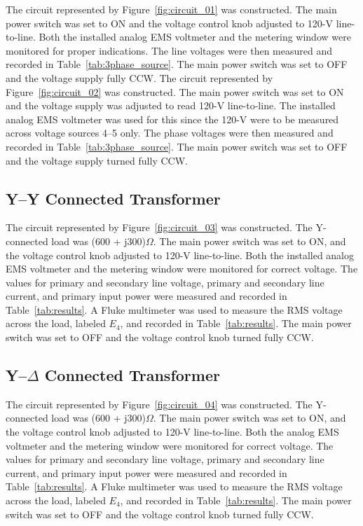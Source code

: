 \documentclass{article}
\begin{document}
\label{part1} The circuit represented by Figure~\ref{fig:circuit_01} was
constructed.  The main power switch was set to ON and the voltage control knob
adjusted to 120-V line-to-line. Both the installed analog EMS voltmeter and the
metering window were monitored for proper indications. The line voltages were
then measured and recorded in Table~\ref{tab:3phase_source}. The main power
switch was set to OFF and the voltage supply fully {CCW}. The circuit
represented by Figure~\ref{fig:circuit_02} was constructed. The main power
switch was set to ON and the voltage supply was adjusted to read 120-V
line-to-line. The installed analog EMS voltmeter was used for this since the
120-V were to be measured across voltage sources 4--5 only. The phase voltages
were then measured and recorded in Table~\ref{tab:3phase_source}.  The main
power switch was set to OFF and the voltage supply turned fully CCW.

\subsection{Y--Y Connected Transformer}

\label{part2} The circuit represented by Figure~\ref{fig:circuit_03} was
constructed.  The Y-connected load was (600 + j300)$\Omega$. The main power
switch was set to ON, and the voltage control knob adjusted to 120-V
line-to-line. Both the installed analog EMS voltmeter and the metering window
were monitored for correct voltage.  The values for primary and secondary line
voltage, primary and secondary line current, and primary input power were
measured and recorded in Table~\ref{tab:results}. A Fluke multimeter was used
to measure the RMS voltage across the load, labeled $E_4$, and recorded in
Table~\ref{tab:results}.  The main power switch was set to OFF and the voltage
control knob turned fully CCW.

\subsection{Y--$\Delta$ Connected Transformer}

\label{part3} The circuit represented by Figure~\ref{fig:circuit_04} was
constructed.  The Y-connected load was (600 + j300)$\Omega$. The main power
switch was set to ON, and the voltage control knob adjusted to 120-V
line-to-line. Both the analog EMS voltmeter and the metering window were
monitored for correct voltage. The values for primary and secondary line
voltage, primary and secondary line current, and primary input power were
measured and recorded in Table~\ref{tab:results}. A Fluke multimeter was used
to measure the RMS voltage across the load, labeled $E_4$, and recorded in
Table~\ref{tab:results}.  The main power switch was set to OFF and the voltage
control knob turned fully CCW.
\end{document}
